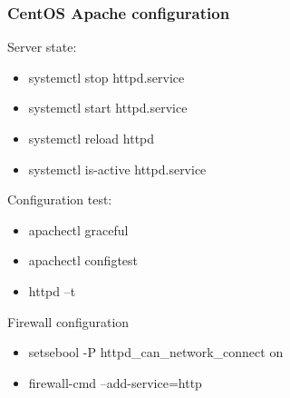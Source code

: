\begin{frame}[fragile]
        \frametitle{CentOS Apache configuration}
Server state:
\begin{itemize}
    \item systemctl stop httpd.service
    \item systemctl start httpd.service
    \item systemctl reload httpd
    \item systemctl is-active httpd.service
\end{itemize}

Configuration test:
\begin{itemize}
    \item apachectl graceful
    \item apachectl configtest
    \item httpd –t 
\end{itemize}
Firewall configuration
\begin{itemize}
    \item setsebool -P httpd\_can\_network\_connect on
    \item firewall-cmd --add-service=http
\end{itemize}

\end{frame}
